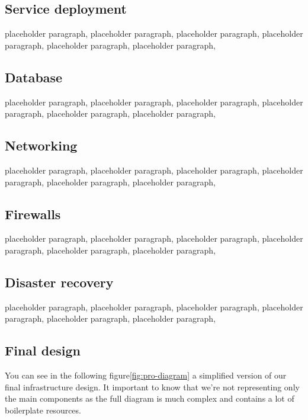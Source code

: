 \subsection{Service deployment}
\qquad 

placeholder paragraph, placeholder paragraph, placeholder paragraph, placeholder paragraph, placeholder paragraph, placeholder paragraph,
\subsection{Database}
\qquad 

placeholder paragraph, placeholder paragraph, placeholder paragraph, placeholder paragraph, placeholder paragraph, placeholder paragraph,
\subsection{Networking}
\qquad 

placeholder paragraph, placeholder paragraph, placeholder paragraph, placeholder paragraph, placeholder paragraph, placeholder paragraph,

\subsection{Firewalls}

placeholder paragraph, placeholder paragraph, placeholder paragraph, placeholder paragraph, placeholder paragraph, placeholder paragraph,


\subsection{Disaster recovery}
placeholder paragraph, placeholder paragraph, placeholder paragraph, placeholder paragraph, placeholder paragraph, placeholder paragraph,

\subsection{Final design}

You can see in the following figure\ref{fig:pro-diagram} a simplified version of our final infrastructure design. It important to know that we're not representing only the main components as the full diagram is much complex and contains a lot of boilerplate resources. 

